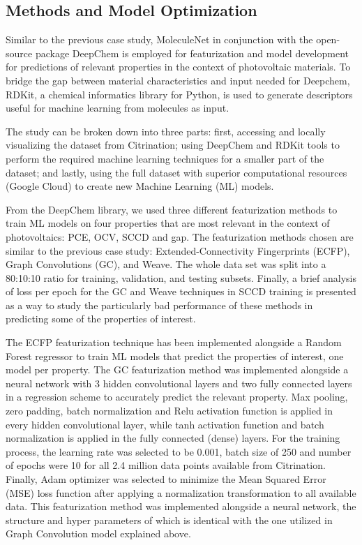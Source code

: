 \documentclass[book.tex]{subfiles}
\begin{document}
\subsection{Methods and Model Optimization}
Similar to the previous case study, MoleculeNet\cite{Pande} in conjunction with the open-source package DeepChem is employed for featurization and model development for predictions of relevant properties in the context of photovoltaic materials. To bridge the gap between material characteristics and input needed for Deepchem, RDKit, a chemical informatics library for Python, is used to generate descriptors useful for machine learning from molecules as input. 

The study can be broken down into three parts: first, accessing and locally visualizing the dataset from Citrination; using DeepChem and RDKit tools to perform the required machine learning techniques for a smaller part of the dataset; and lastly, using the full dataset with superior computational resources (Google Cloud) to create new Machine Learning (ML) models. 

From the DeepChem library, we used three different featurization methods to train ML models on four properties that are most relevant in the context of photovoltaics: PCE, OCV, SCCD and gap. The featurization methods chosen are similar to the previous case study: Extended-Connectivity Fingerprints (ECFP), Graph Convolutions (GC), and Weave. \cite{Wu2018MoleculeNet:Learning} The whole data set was split into a 80:10:10 ratio for training, validation, and testing subsets. Finally, a brief analysis of loss per epoch for the GC and Weave techniques in SCCD training is presented as a way to study the particularly bad performance of these methods in predicting some of the properties of interest. 

The ECFP featurization technique has been implemented alongside a Random Forest regressor to train ML models that predict the properties of interest, one model per property.
The GC featurization method was implemented alongside a neural network with 3 hidden convolutional layers and two fully connected layers in a regression scheme to accurately predict the relevant property. Max pooling, zero padding, batch normalization and Relu activation function is applied in every hidden convolutional layer, while tanh activation function and batch normalization is applied in the fully connected (dense) layers. For the training process, the learning rate was selected to be 0.001, batch size of 250 and number of epochs were 10 for all 2.4 million data points available from Citrination. Finally, Adam optimizer was selected to minimize the Mean Squared Error (MSE) loss function after applying a normalization transformation to all available data. This featurization method was implemented alongside a neural network, the structure and hyper parameters of which is identical with the one utilized in Graph Convolution model explained above.
\end{document}
